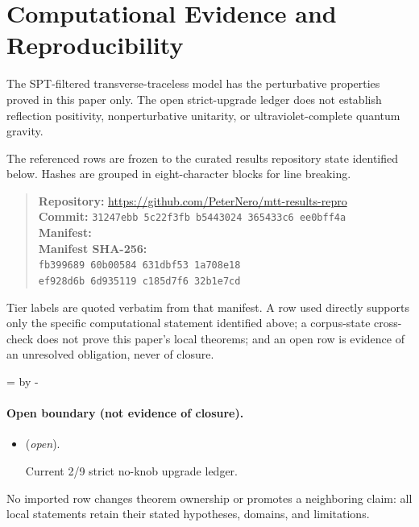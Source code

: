\documentclass[11pt]{article}
\begin{document}


\section*{Computational Evidence and Reproducibility}
The SPT-filtered transverse-traceless model has the perturbative properties proved in this paper only. The open strict-upgrade ledger does not establish reflection positivity, nonperturbative unitarity, or ultraviolet-complete quantum gravity.

The referenced rows are frozen to the curated results repository state identified below. Hashes are grouped in eight-character blocks for line breaking.
\begin{quote}\small
\textbf{Repository:} \url{https://github.com/PeterNero/mtt-results-repro}\\
\textbf{Commit:} \texttt{31247ebb 5c22f3fb b5443024 365433c6 ee0bff4a}\\
\textbf{Manifest:} \\
\textbf{Manifest SHA-256:}\\
\texttt{fb399689 60b00584 631dbf53 1a708e18}\\
\texttt{ef928d6b 6d935119 c185d7f6 32b1e7cd}
\end{quote}

Tier labels are quoted verbatim from that manifest. A row used directly supports only the specific computational statement identified above; a corpus-state cross-check does not prove this paper's local theorems; and an open row is evidence of an unresolved obligation, never of closure.

\par\begingroup{}=\pagegoal\advance{} by -\pagetotal\ifdim\dimen0<7\baselineskip\newpage\fi\endgroup
\paragraph{Open boundary (not evidence of closure).}
\begin{itemize}
\setlength{\itemsep}{0.25em}
\item {} (\emph{open}).\par Current 2/9 strict no-knob upgrade ledger.
\end{itemize}

No imported row changes theorem ownership or promotes a neighboring claim: all local statements retain their stated hypotheses, domains, and limitations.


\end{document}

